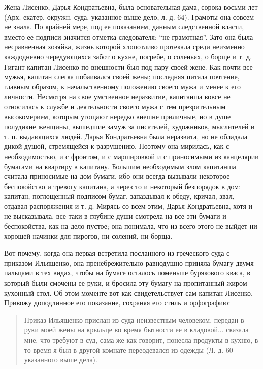 \documentclass[a4paper,20pt]{report}
\begin{document}
Жена Лисенко, Дарья Кондратьевна, была основательная дама, сорока восьми лет 
(Арх. екатер. окружн. суда, указанное выше дело, л. д. 64). Грамоты она совсем не знала.
По крайней мере, под ее показанием, данным следственной власти,
 вместо ее подписи значится отметка следователя:
``не грамотная''. Зато она была несравненная хозяйка,
жизнь которой хлопотливо протекала среди неизменно каждодневно чередующихся 
забот о кухне, погребе, о соленьях,
о борще и т. д. Гигант капитан Лисенко по внешности
был под пару своей жене. Как почти все мужья, капитан слегка побаивался своей жены; 
последняя питала почтение, главным образом, к начальственному положению своего мужа и менее к его
личности. Несмотря на свое умственное неразвитие, капитанша вовсе не относилась к службе и деятельности
своего мужа с тем презрительным высокомерием, которым угощают нередко внешне приличные, но в душе полудикие
женщины, вышедшие замуж за писателей, художников, мыслителей и т. п. выдающихся людей.
Дарья Кондратьевна была неразвита, но не обладала дикой душой, стремящейся к разрушению.
Поэтому она мирилась, как с необходимостью, и с фронтом, и с маршировкой и с приносимыми из канцелярии
бумагами на квартиру в капитану. Большим необходимым
злом капитанша считала приносимые на дом бумаги, ибо
они всегда вызывали некоторое беспокойство и тревогу капитана, 
а через то и некоторый безпорядок в дом: капитан, поглощенный подписом бумаг, 
запаздывал к обеду, кричал, звал, отдавал распоряжения и т. д. Мирясь
со всем этим, Дарья Кондратьевна, хотя и не высказывала,
все таки в глубине души смотрела на все эти бумаги и беспокойства,
как на дело пустое; она понимала, что из всего этого не
выйдет ни хорошей начинки для пирогов, ни солений, ни борща.

Вот почему, когда она первая встретила посланного
из греческого суда с приказом Ильяшенко, она пренебрежительно равнодушно приняла бумагу
двумя пальцами в
тех видах, чтобы на бумаге осталось поменьше бурякового
кваса, в который были смочены ее руки, и бросила эту
бумагу на пропитанный жиром кухонный стол. Об этом
моменте вот как свидетельствует сам капитан Лисенко.
Привожу доподлинное его показание, сохраняя его стиль и орфографию:

\begin{quote}
\em\bfseries
	
Приказ Ильяшенко прислан из суда неизвестным человеком, передан в руки моей
жены на крыльце во время бытности ее в кладовой... сказала мне, что
требуют в суд, сама же как говорит, понесла продукты в кухню, в то
время я был в другой комнате переодевался из одежды (Л. д. 60
указанного выше дела).

\end{quote}
\end{document}
